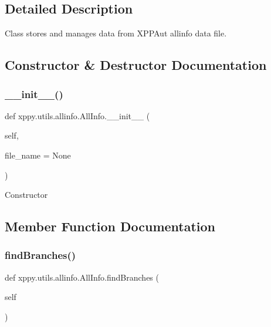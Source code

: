 \subsection{Detailed Description}
\begin{DoxyVerb}Class stores and manages data from XPPAut allinfo data file.
\end{DoxyVerb}
 

\subsection{Constructor \& Destructor Documentation}
\mbox{\label{classxppy_1_1utils_1_1allinfo_1_1_all_info_a3ad3f88c2830799d374025b242d4fb46}} 
\subsubsection{\texorpdfstring{\+\_\+\+\_\+init\+\_\+\+\_\+()}{\_\_init\_\_()}}
{\footnotesize\ttfamily def xppy.\+utils.\+allinfo.\+All\+Info.\+\_\+\+\_\+init\+\_\+\+\_\+ (\begin{DoxyParamCaption}\item[{}]{self,  }\item[{}]{file\+\_\+name = {\ttfamily None} }\end{DoxyParamCaption})}

\begin{DoxyVerb}Constructor
\end{DoxyVerb}
 

\subsection{Member Function Documentation}
\mbox{\label{classxppy_1_1utils_1_1allinfo_1_1_all_info_a559bd122809100e42948ac0b67f2e977}} 
\subsubsection{\texorpdfstring{find\+Branches()}{findBranches()}}
{\footnotesize\ttfamily def xppy.\+utils.\+allinfo.\+All\+Info.\+find\+Branches (\begin{DoxyParamCaption}\item[{}]{self }\end{DoxyParamCaption})}

